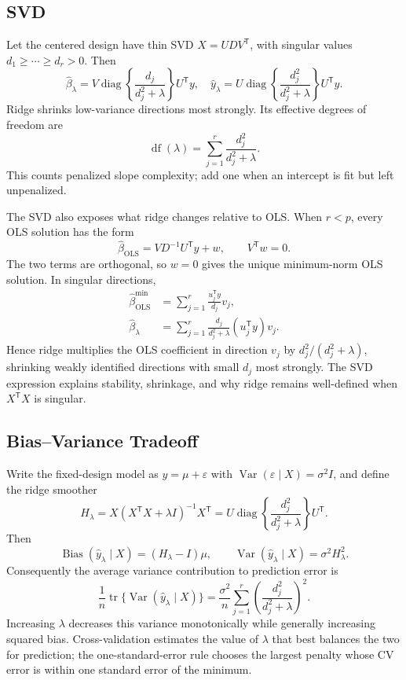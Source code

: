 \documentclass[12pt,oneside]{book}
\numberwithin{equation}{section}
\theoremstyle{definition}
\theoremstyle{plain}
\theoremstyle{remark}
\newcommand{\tr}{\operatorname{tr}}
\newcommand{\diag}{\operatorname{diag}}
\begin{document}
\subsection{SVD}

Let the centered design have thin SVD $X=UDV^\mathsf T$, with singular values
$d_1\geq\cdots\geq d_r>0$. Then
\[
 \widehat\beta_\lambda
 =V\diag\left\{\frac{d_j}{d_j^2+\lambda}\right\}U^\mathsf Ty,
\quad
 \widehat y_\lambda
 =U\diag\left\{\frac{d_j^2}{d_j^2+\lambda}\right\}U^\mathsf Ty.
\]
Ridge shrinks low-variance directions most strongly. Its effective degrees of
freedom are
\[
    \operatorname{df}(\lambda)=\sum_{j=1}^r\frac{d_j^2}{d_j^2+\lambda}.
\]
This counts penalized slope complexity; add one when an intercept is fit but
left unpenalized.

The SVD also exposes what ridge changes relative to OLS. When $r<p$, every OLS
solution has the form
\[
 \widehat\beta_{\mathrm{OLS}}
 =VD^{-1}U^\mathsf Ty+w,
 \qquad V^\mathsf Tw=0.
\]
The two terms are orthogonal, so $w=0$ gives the unique minimum-norm OLS
solution. In singular directions,
\begin{align*}
 \widehat\beta_{\mathrm{OLS}}^{\min}
 &=\sum_{j=1}^r\frac{u_j^\mathsf Ty}{d_j}v_j,\\
 \widehat\beta_\lambda
 &=\sum_{j=1}^r\frac{d_j}{d_j^2+\lambda}(u_j^\mathsf Ty)v_j.
\end{align*}
Hence ridge multiplies the OLS coefficient in direction $v_j$ by
$d_j^2/(d_j^2+\lambda)$, shrinking weakly identified directions with small
$d_j$ most strongly.
The SVD expression explains stability, shrinkage, and why ridge remains
well-defined when $X^\mathsf TX$ is singular.

\subsection{Bias--Variance Tradeoff}

Write the fixed-design model as $y=\mu+\varepsilon$ with
$\operatorname{Var}(\varepsilon\mid X)=\sigma^2I$, and define the ridge
smoother
\[
 H_\lambda=X(X^\mathsf TX+\lambda I)^{-1}X^\mathsf T
 =U\diag\left\{\frac{d_j^2}{d_j^2+\lambda}\right\}U^\mathsf T.
\]
Then
\[
 \operatorname{Bias}(\widehat y_\lambda\mid X)
 =(H_\lambda-I)\mu,
 \qquad
 \operatorname{Var}(\widehat y_\lambda\mid X)=\sigma^2H_\lambda^2.
\]
Consequently the average variance contribution to prediction error is
\begin{equation}
 \frac1n\tr\{\operatorname{Var}(\widehat y_\lambda\mid X)\}
 =\frac{\sigma^2}{n}\sum_{j=1}^r
   \left(\frac{d_j^2}{d_j^2+\lambda}\right)^2.
 \label{eq:ridge-variance}
\end{equation}
Increasing $\lambda$ decreases this variance monotonically while generally
increasing squared bias. Cross-validation estimates the value of $\lambda$
that best balances the two for prediction; the one-standard-error rule chooses
the largest penalty whose CV error is within one standard error of the minimum.
\end{document}
